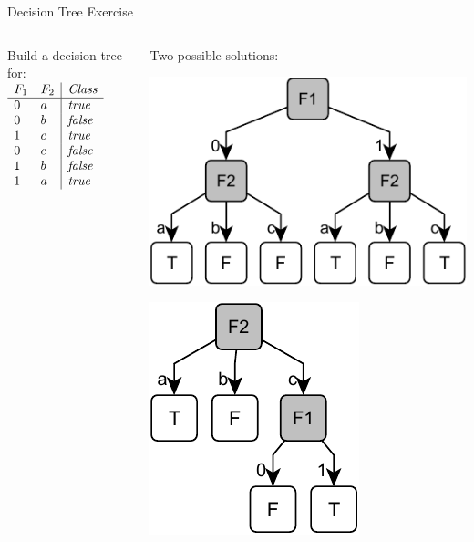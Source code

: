 \documentclass[12pt]{beamer}
\newcommand{\EM}[1]{\mbox{\em#1}}
\begin{document}
\begin{frame}[label=decision-tree-exercise]{Decision Tree Exercise}
	\begin{columns}
		\begin{column}{1.8in}
			Build a decision tree for: \\
			\bigskip
			$
			\begin{array}{ll|l}
				F_1 & F_2 & \EM{Class} \\
				\hline
				0   & a   & \EM{true} \\
				0   & b   & \EM{false} \\
				1   & c   & \EM{true} \\
				0   & c   & \EM{false} \\
				1   & b   & \EM{false} \\
				1   & a   & \EM{true} \\
			\end{array}
			$
		\end{column}
		\pause
		\begin{column}{1.8in}
			Two possible solutions:
		
			\centering
			\bigskip
			\includegraphics[scale=.6]{exercise-1}
			
			\bigskip
			\includegraphics[scale=.6]{exercise-2}
		\end{column}
	\end{columns}
\end{frame}
\end{document}
